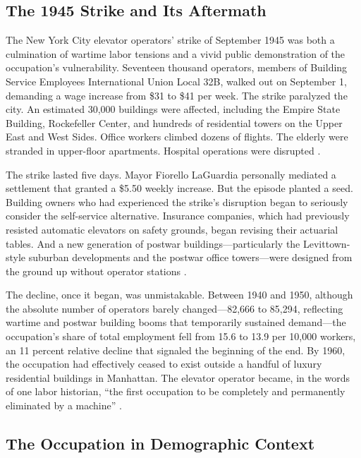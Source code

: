 \documentclass[12pt]{article}
\begin{document}
\subsection{The 1945 Strike and Its Aftermath}

The New York City elevator operators' strike of September 1945 was both a culmination of wartime labor tensions and a vivid public demonstration of the occupation's vulnerability. Seventeen thousand operators, members of Building Service Employees International Union Local 32B, walked out on September 1, demanding a wage increase from \$31 to \$41 per week. The strike paralyzed the city. An estimated 30,000 buildings were affected, including the Empire State Building, Rockefeller Center, and hundreds of residential towers on the Upper East and West Sides. Office workers climbed dozens of flights. The elderly were stranded in upper-floor apartments. Hospital operations were disrupted \citep{gray2013}.

The strike lasted five days. Mayor Fiorello LaGuardia personally mediated a settlement that granted a \$5.50 weekly increase. But the episode planted a seed. Building owners who had experienced the strike's disruption began to seriously consider the self-service alternative. Insurance companies, which had previously resisted automatic elevators on safety grounds, began revising their actuarial tables. And a new generation of postwar buildings---particularly the Levittown-style suburban developments and the postwar office towers---were designed from the ground up without operator stations \citep{price2013}.

The decline, once it began, was unmistakable. Between 1940 and 1950, although the absolute number of operators barely changed---82,666 to 85,294, reflecting wartime and postwar building booms that temporarily sustained demand---the occupation's share of total employment fell from 15.6 to 13.9 per 10,000 workers, an 11 percent relative decline that signaled the beginning of the end. By 1960, the occupation had effectively ceased to exist outside a handful of luxury residential buildings in Manhattan. The elevator operator became, in the words of one labor historian, ``the first occupation to be completely and permanently eliminated by a machine'' \citep{gray2013}.

\subsection{The Occupation in Demographic Context}
\end{document}
